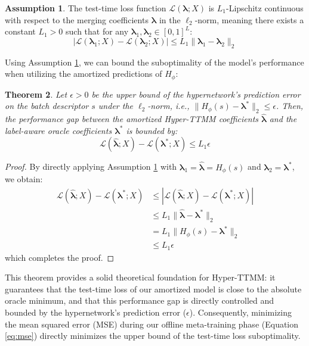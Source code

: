 \documentclass{article}
\theoremstyle{plain}
\newtheorem{theorem}{Theorem}[section]
\theoremstyle{definition}
\newtheorem{assumption}[theorem]{Assumption}
\theoremstyle{remark}
\begin{document}
\begin{assumption}
\label{assump:lipschitz}
The test-time loss function $\mathcal{L}(\boldsymbol{\lambda}; X)$ is $L_1$-Lipschitz continuous with respect to the merging coefficients $\boldsymbol{\lambda}$ in the $\ell_2$-norm, meaning there exists a constant $L_1 > 0$ such that for any $\boldsymbol{\lambda}_1, \boldsymbol{\lambda}_2 \in [0, 1]^L$:
\begin{equation}
|\mathcal{L}(\boldsymbol{\lambda}_1; X) - \mathcal{L}(\boldsymbol{\lambda}_2; X)| \leq L_1 \|\boldsymbol{\lambda}_1 - \boldsymbol{\lambda}_2\|_2
\end{equation}
\end{assumption}

Using Assumption \ref{assump:lipschitz}, we can bound the suboptimality of the model's performance when utilizing the amortized predictions of $H_\phi$:

\begin{theorem}
Let $\epsilon > 0$ be the upper bound of the hypernetwork's prediction error on the batch descriptor $s$ under the $\ell_2$-norm, i.e., $\|H_\phi(s) - \boldsymbol{\lambda}^*\|_2 \leq \epsilon$. Then, the performance gap between the amortized Hyper-TTMM coefficients $\hat{\boldsymbol{\lambda}}$ and the label-aware oracle coefficients $\boldsymbol{\lambda}^*$ is bounded by:
\begin{equation}
\mathcal{L}(\hat{\boldsymbol{\lambda}}; X) - \mathcal{L}(\boldsymbol{\lambda}^*; X) \leq L_1 \epsilon
\end{equation}
\end{theorem}

\begin{proof}
By directly applying Assumption \ref{assump:lipschitz} with $\boldsymbol{\lambda}_1 = \hat{\boldsymbol{\lambda}} = H_\phi(s)$ and $\boldsymbol{\lambda}_2 = \boldsymbol{\lambda}^*$, we obtain:
\begin{align}
\mathcal{L}(\hat{\boldsymbol{\lambda}}; X) - \mathcal{L}(\boldsymbol{\lambda}^*; X) &\leq |\mathcal{L}(\hat{\boldsymbol{\lambda}}; X) - \mathcal{L}(\boldsymbol{\lambda}^*; X)| \\
&\leq L_1 \|\hat{\boldsymbol{\lambda}} - \boldsymbol{\lambda}^*\|_2 \\
&= L_1 \|H_\phi(s) - \boldsymbol{\lambda}^*\|_2 \\
&\leq L_1 \epsilon
\end{align}
which completes the proof.
\end{proof}

This theorem provides a solid theoretical foundation for Hyper-TTMM: it guarantees that the test-time loss of our amortized model is close to the absolute oracle minimum, and that this performance gap is directly controlled and bounded by the hypernetwork's prediction error ($\epsilon$). Consequently, minimizing the mean squared error (MSE) during our offline meta-training phase (Equation \ref{eq:mse}) directly minimizes the upper bound of the test-time loss suboptimality.
\end{document}

